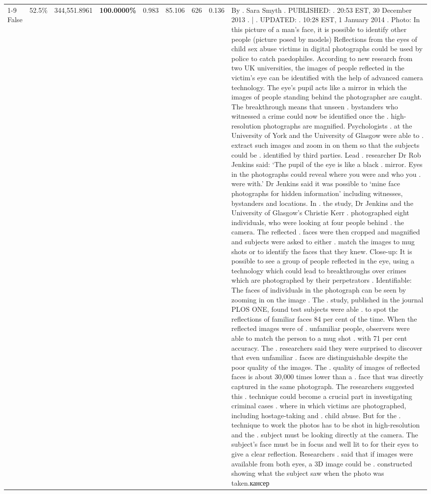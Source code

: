 \begin{table}[H]
\begin{tabular}{lllrlllll}
\cline{1-9} \cline{2-9}
False & 52.5\% & 344,551.8961 & \bfseries \color{red} 100.0000\% & 0.983 & 85.106 & 626 & 0.136 & By . Sara Smyth . PUBLISHED: . 20:53 EST, 30 December 2013 . | . UPDATED: . 10:28 EST, 1 January 2014 . Photo: In this picture of a man's face, it is possible to identify other people (picture posed by models) Reflections from the eyes of child sex abuse victims in digital photographs could be used by police to catch paedophiles. According to new research from two UK universities, the images of people reflected in the victim's eye can be identified with the help of advanced camera technology. The eye's pupil acts like a mirror in which the images of people standing behind the photographer are caught. The breakthrough means that unseen . bystanders who witnessed a crime could now be identified once the . high-resolution photographs are magnified. Psychologists . at the University of York and the University of Glasgow were able to . extract such images and zoom in on them so that the subjects could be . identified by third parties. Lead . researcher Dr Rob Jenkins said: ‘The pupil of the eye is like a black . mirror. Eyes in the photographs could reveal where you were and who you . were with.' Dr Jenkins said it was possible to ‘mine face photographs for hidden information' including witnesses, bystanders and locations. In . the study, Dr Jenkins and the University of Glasgow's Christie Kerr . photographed eight individuals, who were looking at four people behind . the camera. The reflected . faces were then cropped and magnified and subjects were asked to either . match the images to mug shots or to identify the faces that they knew. Close-up: It is possible to see a group of people reflected in the eye, using a technology which could lead to breakthroughs over crimes which are photographed by their perpetrators . Identifiable: The faces of individuals in the photograph can be seen by zooming in on the image . The . study, published in the journal PLOS ONE, found test subjects were able . to spot the reflections of familiar faces 84 per cent of the time. When the reflected images were of . unfamiliar people, observers were able to match the person to a mug shot . with 71 per cent accuracy. The . researchers said they were surprised to discover that even unfamiliar . faces are distinguishable despite the poor quality of the images. The . quality of images of reflected faces is about 30,000 times lower than a . face that was directly captured in the same photograph. The researchers suggested this . technique could become a crucial part in investigating criminal cases . where in which victims are photographed, including hostage-taking and . child abuse. But for the . technique to work the photos has to be shot in high-resolution and the . subject must be looking directly at the camera. The subject's face must be in focus and well lit to for their eyes to give a clear reflection. Researchers . said that if images were available from both eyes, a 3D image could be . constructed showing what the subject saw when the photo was taken.кансер \\

\end{tabular}
\end{table}
